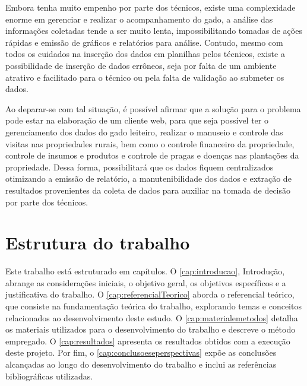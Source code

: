 Embora tenha muito empenho por parte dos técnicos, existe uma complexidade enorme em gerenciar e realizar o acompanhamento do gado, a análise das informações coletadas tende a ser muito lenta, impossibilitando tomadas de ações rápidas e emissão de gráficos e relatórios para análise. Contudo, mesmo com todos os cuidados na inserção dos dados em planilhas pelos técnicos, existe a possibilidade de inserção de dados errôneos, seja por falta de um ambiente atrativo e facilitado para o técnico ou pela falta de validação ao submeter os dados.

Ao deparar-se com tal situação, é possível afirmar que a solução para o problema pode estar na elaboração de um cliente web, para que seja possível ter o gerenciamento dos dados do gado leiteiro, realizar o manuseio e controle das visitas nas propriedades rurais, bem como o controle financeiro da propriedade, controle de insumos e produtos e controle de pragas e doenças nas plantações da propriedade. Dessa forma, possibilitará que os dados fiquem centralizados otimizando a emissão de relatório, a manutenibilidade dos dados e extração de resultados provenientes da coleta de dados para auxiliar na tomada de decisão por parte dos técnicos.


\section{Estrutura do trabalho}\label{sec:estruturaTrabalho}

Este trabalho está estruturado em capítulos. O \autoref{cap:introducao}, Introdução, abrange as considerações iniciais, o objetivo geral, os objetivos específicos e a justificativa do trabalho. O \autoref{cap:referencialTeorico} aborda o referencial teórico, que consiste na fundamentação teórica do trabalho, explorando temas e conceitos relacionados ao desenvolvimento deste estudo. O \autoref{cap:materialemetodos} detalha os materiais utilizados para o desenvolvimento do trabalho e descreve o método empregado. O \autoref{cap:resultados} apresenta os resultados obtidos com a execução deste projeto. Por fim, o \autoref{cap:conclusoeseperspectivas} expõe as conclusões alcançadas ao longo do desenvolvimento do trabalho e inclui as referências bibliográficas utilizadas.
